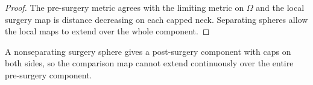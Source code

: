 \begin{proof}
\sketch
{}
The pre-surgery metric agrees with the limiting metric on $\Omega$ and the
local surgery map is distance decreasing on each capped neck. Separating
spheres allow the local maps to extend over the whole component.
\end{proof}

\begin{remark}
\label{rem:nonseparating-surgery-sphere}
A nonseparating surgery sphere gives a post-surgery component with caps on both
sides, so the comparison map cannot extend continuously over the entire
pre-surgery component.
\end{remark}
